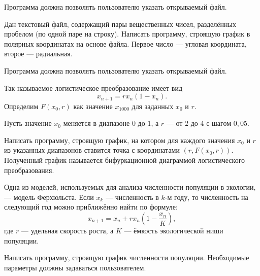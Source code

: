 Программа должна позволять пользователю указать открываемый файл.

\task Дан текстовый файл, содержащий пары вещественных чисел,
разделённых пробелом (по одной паре на строку). Написать программу,
строящую график в полярных координатах на основе файла. Первое число —
угловая координата, второе — радиальная.

Программа должна позволять пользователю указать открываемый файл.

\task Так называемое логистическое преобразование имеет вид
\[
x_{n+1} = rx_n(1-x_n).
\]
Определим $F(x_0, r)$ как значение $x_{1000}$ для заданных $x_0$ и $r$.

Пусть значение $x_0$ меняется в диапазоне $0$ до $1$, а $r$ — от $2$
до $4$ с шагом $0{,}05$.

Написать программу, строящую график, на котором для каждого значения
$x_0$ и $r$ из указанных диапазонов ставится точка с координатами
$(r, F(x_0, r))$. Полученный график называется бифуркационной
диаграммой логистического преобразования.

\task Одна из моделей, используемых для анализа численности популяции
в экологии, — модель Ферхюльста. Если $x_k$ — численность в $k$-м
году, то численность на следующий год можно приближённо найти по
формуле:
\[
x_{n+1} = x_n + r x_n \left( 1 - \frac{x_n}K \right),
\]
где $r$ — удельная скорость роста, а $K$ — ёмкость экологической ниши
популяции.

Написать программу, строящую график численности популяции. Необходимые
параметры должны задаваться пользователем.

